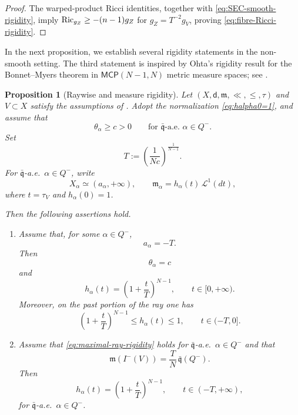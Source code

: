 \documentclass[a4paper,10pt]{article}
\newcommand{\MCP}{\mathsf{MCP}}
\newcommand{\Ric}{{\rm Ric}}
\newcommand{\mm}{\mathfrak m}
\newcommand{\qq}{\mathfrak q}
\newcommand{\sfd}{\mathsf d}
\theoremstyle{plain}
\newtheorem{proposition}[lemma]{Proposition}
\theoremstyle{definition}
\numberwithin{equation}{section}
\begin{document}
\begin{proof}
The warped-product Ricci identities, together with
\eqref{eq:SEC-smooth-rigidity}, imply
$\Ric_{g_Z}\geq-(n-1)g_Z$ for $g_Z=T^{-2}g_V$, proving
\eqref{eq:fibre-Ricci-rigidity}.
\end{proof}



In the next proposition, we establish several rigidity statements in the non-smooth setting. The third statement is inspired by Ohta's rigidity result for the Bonnet--Myers theorem in $\MCP(N-1,N)$ metric measure spaces; see \cite[Theorem~5.5]{OhtaJLMS}.

\begin{proposition}[Raywise and measure rigidity]
\label{prop:raywise-measure-rigidity}
Let $(X,\sfd,\mm,\ll,\leq,\tau)$ and $V\subset X$ satisfy the assumptions
of . Adopt the normalization
\eqref{eq:halpha0=1}, and assume that
\[
    \theta_\alpha\geq c>0
    \qquad\text{for $\bar{\qq}$-a.e.\ $\alpha\in Q^-$}.
\]
Set
\begin{equation}\label{eq:defT-rigidity}
    T:=\left(\frac{1}{Nc}\right)^{\frac1{N-1}}.
\end{equation}
For $\bar{\qq}$-a.e.\ $\alpha\in Q^-$, write
\[
    X_\alpha\simeq(a_\alpha,+\infty),
    \qquad
    \mm_\alpha=h_\alpha(t)\,\mathcal L^1(dt),
\]
where $t=\tau_V$ and $h_\alpha(0)=1$.

Then the following assertions hold.

\begin{enumerate}
\item[\rm (i)]
Assume that, for some $\alpha\in Q^-$,
\begin{equation}\label{eq:maximal-ray-rigidity}
    a_\alpha=-T.
\end{equation}
Then
\begin{equation}\label{eq:theta-equality-ray}
    \theta_\alpha=c
\end{equation}
and
\begin{equation}\label{eq:future-cone-density}
    h_\alpha(t)
    =
    \left(1+\frac{t}{T}\right)^{N-1},
    \qquad t\in[0,+\infty).
\end{equation}
Moreover, on the past portion of the ray one has
\begin{equation}\label{eq:past-cone-lower-bound}
    \left(1+\frac{t}{T}\right)^{N-1}
    \leq h_\alpha(t)\leq 1,
    \qquad t\in(-T,0].
\end{equation}

\item[\rm (ii)]
Assume that \eqref{eq:maximal-ray-rigidity} holds for
$\bar{\qq}$-a.e.\ $\alpha\in Q^-$ and that
\begin{equation}\label{eq:past-volume-rigidity-assumption}
    \mm(I^-(V))
    =
    \frac{T}{N}\,\bar{\qq}(Q^-).
\end{equation}
Then
\begin{equation}\label{eq:full-cone-density}
    h_\alpha(t)
    =
    \left(1+\frac{t}{T}\right)^{N-1},
    \qquad
    t\in(-T,+\infty),
\end{equation}
for $\bar{\qq}$-a.e.\ $\alpha\in Q^-$.


\end{enumerate}
\end{proposition}
\end{document}
